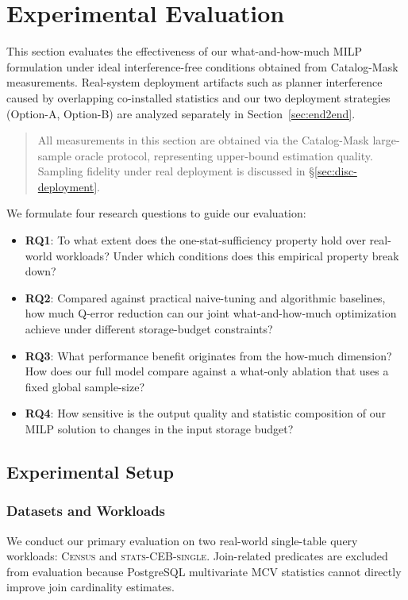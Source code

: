\documentclass[sigconf, nonacm]{acmart}
\begin{document}
\section{Experimental Evaluation}
\label{sec:evaluation}
\label{sec:findings}

This section evaluates the effectiveness of our what-and-how-much MILP formulation under ideal interference-free conditions obtained from Catalog-Mask measurements. Real-system deployment artifacts such as planner interference caused by overlapping co-installed statistics and our two deployment strategies (Option-A, Option-B) are analyzed separately in Section~\ref{sec:end2end}.

\begin{quote}
All measurements in this section are obtained via the Catalog-Mask large-sample oracle protocol, representing upper-bound estimation quality. Sampling fidelity under real deployment is discussed in \S\ref{sec:disc-deployment}.
\end{quote}

We formulate four research questions to guide our evaluation:
\begin{itemize}
    \item \textbf{RQ1}: To what extent does the one-stat-sufficiency property hold over real-world workloads? Under which conditions does this empirical property break down?
    \item \textbf{RQ2}: Compared against practical naive-tuning and algorithmic baselines, how much Q-error reduction can our joint what-and-how-much optimization achieve under different storage-budget constraints?
    \item \textbf{RQ3}: What performance benefit originates from the how-much dimension? How does our full model compare against a what-only ablation that uses a fixed global sample-size?
    \item \textbf{RQ4}: How sensitive is the output quality and statistic composition of our MILP solution to changes in the input storage budget?
\end{itemize}

\subsection{Experimental Setup}
\label{sec:setup}

\subsubsection{Datasets and Workloads}
We conduct our primary evaluation on two real-world single-table query workloads: \textsc{Census} and \textsc{stats-CEB-single}. Join-related predicates are excluded from evaluation because PostgreSQL multivariate MCV statistics cannot directly improve join cardinality estimates.
\end{document}
